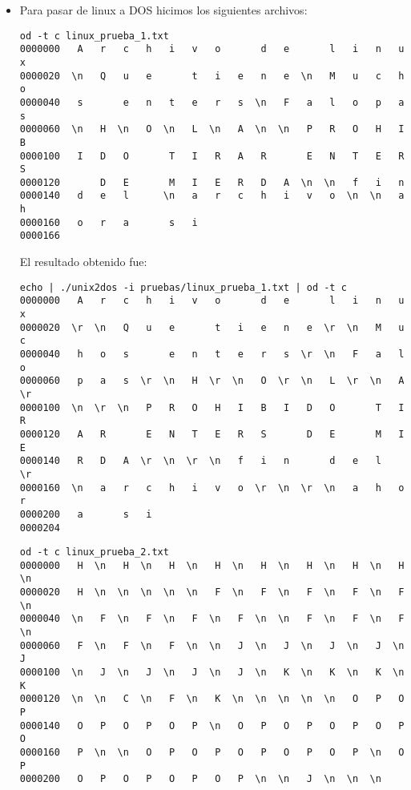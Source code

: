 \documentclass[a4paper,11pt]{article}
\begin{document}
\begin{itemize}
\item Para pasar de linux a DOS hicimos los siguientes archivos:
\begin{verbatim}
od -t c linux_prueba_1.txt 
0000000   A   r   c   h   i   v   o       d   e       l   i   n   u   x
0000020  \n   Q   u   e       t   i   e   n   e  \n   M   u   c   h   o
0000040   s       e   n   t   e   r   s  \n   F   a   l   o   p   a   s
0000060  \n   H  \n   O  \n   L  \n   A  \n  \n   P   R   O   H   I   B
0000100   I   D   O       T   I   R   A   R       E   N   T   E   R   S
0000120       D   E       M   I   E   R   D   A  \n  \n   f   i   n    
0000140   d   e   l      \n   a   r   c   h   i   v   o  \n  \n   a   h
0000160   o   r   a       s   i
0000166
\end{verbatim}

El resultado obtenido fue:
\begin{verbatim}
echo | ./unix2dos -i pruebas/linux_prueba_1.txt | od -t c
0000000   A   r   c   h   i   v   o       d   e       l   i   n   u   x
0000020  \r  \n   Q   u   e       t   i   e   n   e  \r  \n   M   u   c
0000040   h   o   s       e   n   t   e   r   s  \r  \n   F   a   l   o
0000060   p   a   s  \r  \n   H  \r  \n   O  \r  \n   L  \r  \n   A  \r
0000100  \n  \r  \n   P   R   O   H   I   B   I   D   O       T   I   R
0000120   A   R       E   N   T   E   R   S       D   E       M   I   E
0000140   R   D   A  \r  \n  \r  \n   f   i   n       d   e   l      \r
0000160  \n   a   r   c   h   i   v   o  \r  \n  \r  \n   a   h   o   r
0000200   a       s   i
0000204
\end{verbatim}

\begin{verbatim}
od -t c linux_prueba_2.txt 
0000000   H  \n   H  \n   H  \n   H  \n   H  \n   H  \n   H  \n   H  \n
0000020   H  \n  \n  \n  \n  \n   F  \n   F  \n   F  \n   F  \n   F  \n
0000040  \n   F  \n   F  \n   F  \n   F  \n  \n   F  \n   F  \n   F  \n
0000060   F  \n   F  \n   F  \n  \n   J  \n   J  \n   J  \n   J  \n   J
0000100  \n   J  \n   J  \n   J  \n   J  \n   K  \n   K  \n   K  \n   K
0000120  \n  \n   C  \n   F  \n   K  \n  \n  \n  \n  \n   O   P   O   P
0000140   O   P   O   P   O   P  \n   O   P   O   P   O   P   O   P   O
0000160   P  \n  \n   O   P   O   P   O   P   O   P   O   P  \n   O   P
0000200   O   P   O   P   O   P   O   P  \n  \n   J  \n  \n  \n
\end{verbatim}


\end{itemize}
\end{document}

